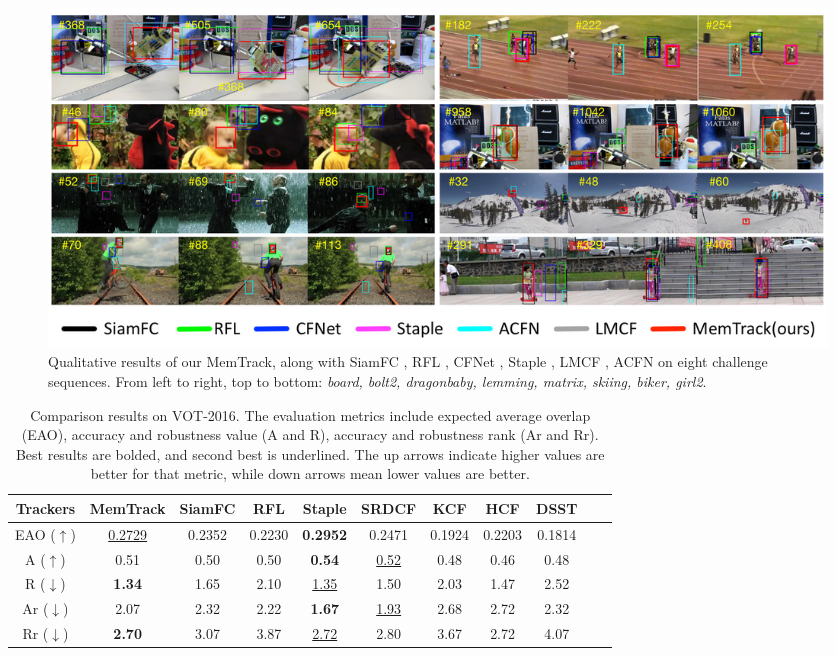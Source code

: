 \documentclass[runningheads]{llncs}
\begin{document}
\begin{figure}[t]
	\begin{center}
		\includegraphics[width=0.95\linewidth]{qualitative.jpg}
	\end{center}
	\vspace{-5mm}
	\caption{Qualitative results of our MemTrack, along with  SiamFC \cite{Bertinetto2016}, RFL \cite{Yang2017}, CFNet \cite{Valmadre2017},  Staple \cite{Bertinetto2016-1}, LMCF \cite{Wang2017}, ACFN \cite{Choi2017} on eight challenge sequences. From left to right, top to bottom: \textit{board, bolt2, dragonbaby, lemming, matrix, skiing, biker, girl2}.}
	\label{fig:12}
\end{figure}

\begin{table}
	\small
	\begin{center}
		\bgroup
		\def\arraystretch{1.15}
		\begin{tabular}{ccccccccccc}
			\hline 
			Trackers & MemTrack & SiamFC & RFL & Staple & SRDCF & KCF & HCF  & DSST \\
			\hline
			EAO ($\uparrow$) & \underline{0.2729} & 0.2352 & 0.2230 & \textbf{0.2952} & 0.2471 & 0.1924 & 0.2203 & 0.1814\\
			A ($\uparrow$) & 0.51 & 0.50  & 0.50 & \textbf{0.54} & \underline{0.52} & 0.48 & 0.46 & 0.48\\
			R ($\downarrow$) & \textbf{1.34} & 1.65 &  2.10 & \underline{1.35} & 1.50 & 2.03 & 1.47 & 2.52\\
			Ar ($\downarrow$) & 2.07  & 2.32 & 2.22 &\textbf{1.67} & \underline{1.93} & 2.68 & 2.72 & 2.32 \\	
			Rr ($\downarrow$) & \textbf{2.70}& 3.07  & 3.87  &\underline{2.72}  & 2.80  & 3.67 & 2.72 & 4.07 \\
			\hline
		\end{tabular} 
		\egroup
	\end{center}
	\caption{Comparison results on VOT-2016. The evaluation metrics include expected average overlap (EAO), accuracy and robustness value (A and R), accuracy and robustness rank (Ar and Rr). Best results are bolded, and second best is underlined. The up arrows indicate higher values are better for that metric, while down arrows mean lower values are better.
	}
	\label{tb:2}
\end{table}
\end{document}
